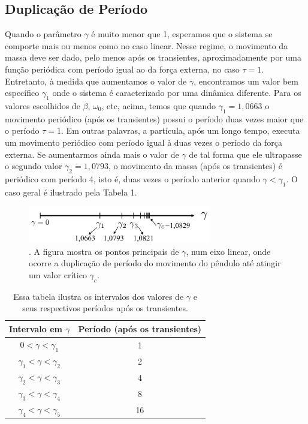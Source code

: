 \documentclass{article}
\begin{document}
\subsection{Duplicação de Período}

Quando o parâmetro $\gamma$ é muito menor que 1, esperamos que o sistema se comporte mais ou menos como no caso linear. Nesse regime, o movimento da massa deve ser dado, pelo menos após os transientes, aproximadamente por uma função periódica com período igual ao da força externa, no caso $\tau = 1$. Entretanto, à medida que aumentamos o valor de $\gamma$, encontramos um valor bem específico $\gamma_1$ onde o sistema é caracterizado por uma dinâmica diferente. Para os valores escolhidos de $\beta$, $\omega_0$, etc, acima, temos que quando $\gamma_1=1,0663$ o movimento periódico (após os transientes) possui o período duas vezes maior que o período $\tau = 1$. Em outras palavras, a partícula, após um longo tempo, executa um movimento periódico com período igual à duas vezes o período da força externa. Se aumentarmos ainda mais o valor de $\gamma$ de tal forma que ele ultrapasse o segundo valor $\gamma_2 = 1,0793$, o movimento da massa (após os transientes) é periódico com período 4, isto é, duas vezes o período anterior quando $\gamma < \gamma_1$. O caso geral é ilustrado pela Tabela 1. 

\begin{figure}[h]
\centering
\includegraphics[width=8cm]{fig2.png}
\captionsetup{labelsep=none}
\caption{. A figura mostra os pontos principais de $\gamma$, num eixo linear, onde ocorre a duplicação de período do movimento do pêndulo até atingir um valor crítico $\gamma_c$. }
\end{figure}
 
\begin{table}[h!]
\centering
\begin{tabular}{||c c||} 
 \hline
 Intervalo em $\gamma$ & Período (após os transientes) \\ [0.5ex] 
 \hline\hline
 $0 < \gamma < \gamma_1$ & 1 \\ 
 $\gamma_1 < \gamma < \gamma_2$ & 2 \\
 $\gamma_2 < \gamma < \gamma_3$ & 4 \\
 $\gamma_3 < \gamma < \gamma_4$ & 8 \\
 $\gamma_4 < \gamma < \gamma_5$ & 16 \\ [1ex] 
 \hline
\end{tabular}
\caption{Essa tabela ilustra os intervalos dos valores de $\gamma$ e seus respectivos períodos após os transientes.}
\label{table:1}
\end{table}
\end{document}
